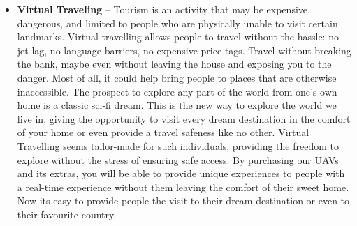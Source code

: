 \begin{itemize}
    \item \textbf{Virtual Traveling} -- Tourism is an activity that may be expensive, dangerous, and limited to people who are physically unable to visit certain landmarks.
    Virtual travelling allows people to travel without the hassle: no jet lag, no language barriers, no expensive price tags. Travel without breaking the bank, maybe even without leaving the house and exposing you to the danger. Most of all, it could help bring people to places that are otherwise inaccessible. The prospect to explore any part of the world from one's own home is a classic sci-fi dream. 
    This is the new way to explore the world we live in, giving the opportunity to visit every dream destination in the comfort of your home or even provide a travel safeness like no other. Virtual Travelling seems tailor-made for such individuals, providing the freedom to explore without the stress of ensuring safe access.     
    By purchasing our UAVs and its extras, you will be able to provide unique experiences to people with a real-time experience without them leaving the comfort of their sweet home. Now its easy to provide people the visit to their dream destination or even to their favourite country.  
\end{itemize}
